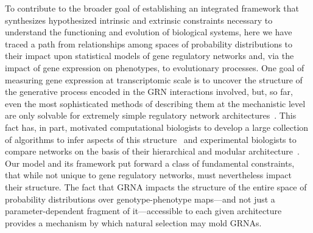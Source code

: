 To contribute to the broader goal of establishing an integrated framework that synthesizes hypothesized intrinsic and extrinsic constraints necessary to understand the functioning and evolution of biological systems, here we have traced a path from relationships among spaces of probability distributions to their impact upon statistical models of gene regulatory networks and, via the impact of gene expression on phenotypes, to evolutionary processes. One goal of measuring gene expression at transcriptomic scale is to uncover the structure of the generative process encoded in the GRN interactions involved, but, so far, even the most sophisticated methods of describing them at the mechanistic level are only solvable for extremely simple regulatory network architectures~\cite{Walczak2009,Mugler2009}. This fact has, in part, motivated computational biologists to develop a large collection of algorithms to infer aspects of this structure~\cite{DeSmet2010} and experimental biologists to compare networks on the basis of their hierarchical and modular architecture~\cite{Ideker2012}. Our model and its framework put forward a class of fundamental constraints, that while not unique to gene regulatory networks, must nevertheless impact their structure. The fact that GRNA impacts the structure of the entire space of probability distributions over genotype-phenotype maps---and not just a parameter-dependent fragment of it---accessible to each given architecture provides a mechanism by which natural selection may mold GRNAs.

